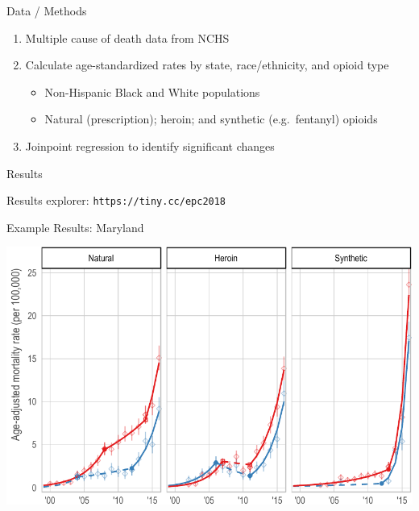 \documentclass[ignorenonframetext,compress]{beamer}
\providecommand{\tightlist}{%
  \setlength{\itemsep}{0pt}\setlength{\parskip}{0pt}}
\begin{document}
\begin{frame}{Data / Methods}

\begin{enumerate}
\def\labelenumi{\arabic{enumi}.}
\tightlist
\item
  Multiple cause of death data from NCHS
\item
  Calculate age-standardized rates by state, race/ethnicity, and opioid
  type

  \begin{itemize}
  \tightlist
  \item
    Non-Hispanic Black and White populations
  \item
    Natural (prescription); heroin; and synthetic (e.g.~fentanyl)
    opioids
  \end{itemize}
\item
  Joinpoint regression to identify significant changes
\end{enumerate}

\end{frame}

\begin{frame}{Results}

Results explorer: \texttt{https://tiny.cc/epc2018}

\end{frame}

\begin{frame}{Example Results: Maryland}

\includegraphics{epc_slides_files/figure-beamer/unnamed-chunk-6-1.pdf}

\end{frame}
\end{document}
